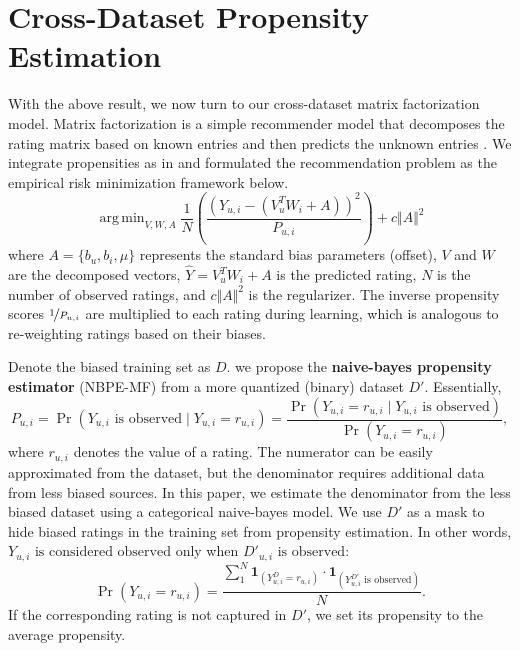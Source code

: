 \documentclass{article}
\newcommand{\vect}[1]{\boldsymbol{#1}}
\DeclareMathOperator*{\argmin}{arg\,min}
\begin{document}
\section{Cross-Dataset Propensity Estimation}
With the above result, we now turn to our cross-dataset matrix factorization model. Matrix factorization is a simple recommender model that decomposes the rating matrix based on known entries and then predicts the unknown entries \cite{koren2009matrix}. We integrate propensities as in \citep{schnabel2016recommendations} and formulated the recommendation problem as the empirical risk minimization framework below. 
\begin{equation} \argmin_{V,W,A} \frac{1}{N}\left(\frac{(Y_{u,i}- (V_u^TW_i + A))^2}{P_{u,i}} \right) + c \Vert A \Vert^2
\end{equation}
where $A = \{ b_u, b_i, \mu \}$ represents the standard bias parameters (offset), $V$ and $W$ are the decomposed vectors, $\hat{Y} = V_u^TW_i + A$ is the predicted rating, $N$ is the number of observed ratings, and $c \Vert A \Vert^2$ is the regularizer. The inverse propensity scores $\nicefrac{1}{P_{u,i}}$ are multiplied to each rating during learning, which is analogous to re-weighting ratings based on their biases.

Denote the biased training set as $D$. we propose the \textbf{naive-bayes propensity estimator} (NBPE-MF) from a more quantized (binary) dataset $D'$. Essentially,
\begin{equation} 
  P_{u,i} = \Pr(Y_{u,i} \text{ is observed} \mid Y_{u,i} = r_{u,i}) = \frac{\Pr(Y_{u,i} = r_{u,i} \mid Y_{u,i} \text{ is observed})}{\Pr(Y_{u,i} = r_{u,i})},
\end{equation}
where $r_{u,i}$ denotes the value of a rating. The numerator can be easily approximated from the dataset, but the denominator requires additional data from less biased sources. In this paper, we estimate the denominator from the less biased dataset using a categorical naive-bayes model. We use $D'$ as a mask to hide biased ratings in the training set from propensity estimation. In other words, $Y_{u,i} \text{ is considered observed}$ only when $D'_{u,i} \text{ is observed}$:
\begin{equation} 
  \Pr(Y_{u,i} = r_{u,i}) = \frac{\sum_1^N \vect 1_{(Y^D_{u,i} = r_{u,i})} \cdot \vect 1_{(Y^{D'}_{u,i} \text{ is observed})} }{N}.
\end{equation}
If the corresponding rating is not captured in $D'$, we set its propensity to the average propensity.
\end{document}
